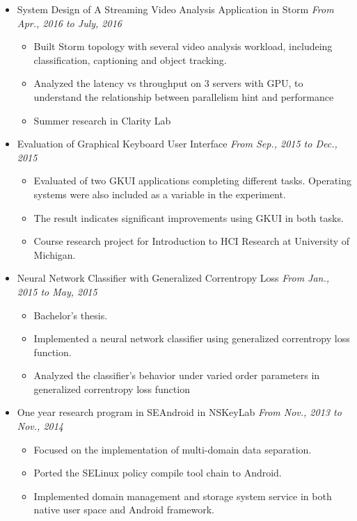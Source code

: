 \documentclass[a4paper,11pt]{article}
\begin{document}
\begin{itemize}
    \item System Design of A Streaming Video Analysis Application in Storm \hfill \textit{From Apr., 2016 to 
July, 2016}
    \begin{itemize}
        \item Built Storm topology with several video analysis workload, includeing classification, 
captioning and object tracking.
        \item Analyzed the latency vs throughput on 3 servers with GPU, to understand the relationship 
between parallelism hint and performance
        \item Summer research in Clarity Lab
    \end{itemize}

    \item Evaluation of Graphical Keyboard User Interface \hfill \textit{From Sep., 2015 to Dec., 2015}
    \begin{itemize}
        \item Evaluated of two GKUI applications completing different tasks. Operating systems were also
included as a variable in the experiment.
        \item The result indicates significant improvements using GKUI in both tasks.
        \item Course research project for Introduction to HCI Research at University of Michigan.
    \end{itemize}

    \item Neural Network Classifier with Generalized Correntropy Loss \hfill \textit{From Jan., 2015 to
May, 2015}
    \begin{itemize}
        \item Bachelor's thesis.
        \item Implemented a neural network classifier using generalized correntropy loss function.
        \item Analyzed the classifier's behavior under varied order parameters in generalized correntropy loss
function
    \end{itemize}

    \item One year research program in SEAndroid in NSKeyLab \hfill \textit{From Nov., 2013 to Nov., 2014}
    \begin{itemize}
        \item Focused on the implementation of multi-domain data separation.
        \item Ported the SELinux policy compile tool chain to Android.
        \item Implemented domain management and storage system service in both native user space and Android
framework.
    \end{itemize}


\end{itemize}
\end{document}
